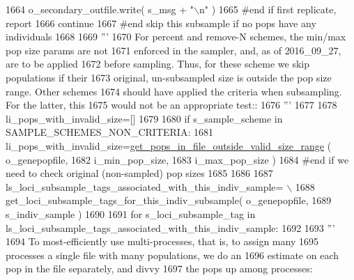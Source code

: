 \begin{DoxyCode}
1664                 o\_secondary\_outfile.write( s\_msg + \textcolor{stringliteral}{"\(\backslash\)n"} )
1665             \textcolor{comment}{#end if first replicate, report}
1666             \textcolor{keywordflow}{continue}
1667         \textcolor{comment}{#end skip this subsample if no pops have any individuals}
1668 
1669         \textcolor{stringliteral}{'''}
1670 \textcolor{stringliteral}{        For percent and remove-N schemes, the min/max pop size params are not }
1671 \textcolor{stringliteral}{        enforced in the sampler, and, as of 2016\_09\_27, are to be applied}
1672 \textcolor{stringliteral}{        before sampling.  Thus, for these scheme we skip populations if their }
1673 \textcolor{stringliteral}{        original, un-subsampled size is outside the pop size range.  Other schemes}
1674 \textcolor{stringliteral}{        should have applied the criteria when subsampling.  For the latter, this}
1675 \textcolor{stringliteral}{        would not be an appropriate test::}
1676 \textcolor{stringliteral}{        '''}
1677 
1678         li\_pops\_with\_invalid\_size=[]
1679         
1680         \textcolor{keywordflow}{if} s\_sample\_scheme \textcolor{keywordflow}{in} SAMPLE\_SCHEMES\_NON\_CRITERIA:
1681             li\_pops\_with\_invalid\_size=\hyperlink{namespacenegui_1_1pgdriveneestimator_ab546af99f06d3ec795da61f806ffafa9}{get\_pops\_in\_file\_outside\_valid\_size\_range}
      ( o\_genepopfile, 
1682                                                                                 i\_min\_pop\_size,
1683                                                                                 i\_max\_pop\_size )
1684         \textcolor{comment}{#end if we need to check original (non-sampled) pop sizes}
1685 
1686 
1687         ls\_loci\_subsample\_tags\_associated\_with\_this\_indiv\_sample= \(\backslash\)
1688                 get\_loci\_subsample\_tags\_for\_this\_indiv\_subsample( o\_genepopfile,
1689                                                                     s\_indiv\_sample )
1690 
1691         \textcolor{keywordflow}{for} s\_loci\_subsample\_tag \textcolor{keywordflow}{in} ls\_loci\_subsample\_tags\_associated\_with\_this\_indiv\_sample:
1692 
1693             \textcolor{stringliteral}{'''}
1694 \textcolor{stringliteral}{            To most-efficiently use multi-processes, that is, to assign many}
1695 \textcolor{stringliteral}{            processes a single file with many populations, we do an}
1696 \textcolor{stringliteral}{            estimate on each pop in the file separately, and divvy}
1697 \textcolor{stringliteral}{            the pops up among processes:}

\end{DoxyCode}
